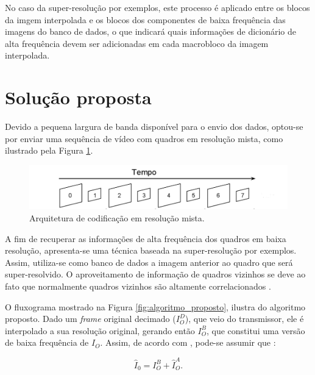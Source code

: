 No caso da super-resolução por exemplos, este processo é aplicado entre os blocos da imgem interpolada e os blocos dos componentes  de baixa frequência das imagens do banco de dados, o que indicará quais informações de dicionário de alta frequência devem ser adicionadas em cada macrobloco da imagem interpolada.

\section{Solução proposta} 
\label{algPropos}

Devido a pequena largura de banda disponível para o envio dos dados, optou-se por enviar uma sequência de vídeo com quadros em resolução mista, como ilustrado pela Figura \ref{fig:resolucao_mista}.

\begin{figure}[h]
	\centering
	\includegraphics[scale=0.45]{figuras/resolucao_mista.png}
	\caption{ Arquitetura de codificação em resolução mista.}

	\label{fig:resolucao_mista}
\end{figure}

A fim de recuperar as informações de alta frequência dos quadros em baixa resolução, apresenta-se uma técnica baseada na super-resolução por exemplos. Assim, utiliza-se como banco de dados a imagem anterior ao quadro que será super-resolvido.
    O aproveitamento de informação de quadros vizinhos se deve ao fato que normalmente  quadros vizinhos são altamente correlacionados \cite{silva2009super}.


O fluxograma mostrado na Figura \ref{fig:algoritmo_proposto}, ilustra do algoritmo proposto. Dado um \textit{frame} original  decimado ($I_O^D$), que veio do transmissor, ele é interpolado a sua resolução original,  gerando então $I_O^B$, que constitui uma versão de baixa frequência de $I_O$.  Assim, de acordo com \cite{garcia2013tecnicas}, pode-se  assumir que  :

\begin{equation}
\widehat{I}_0 = I_O^B + \widehat{I}_O^A.
\label{eq_HF}
\end{equation}

